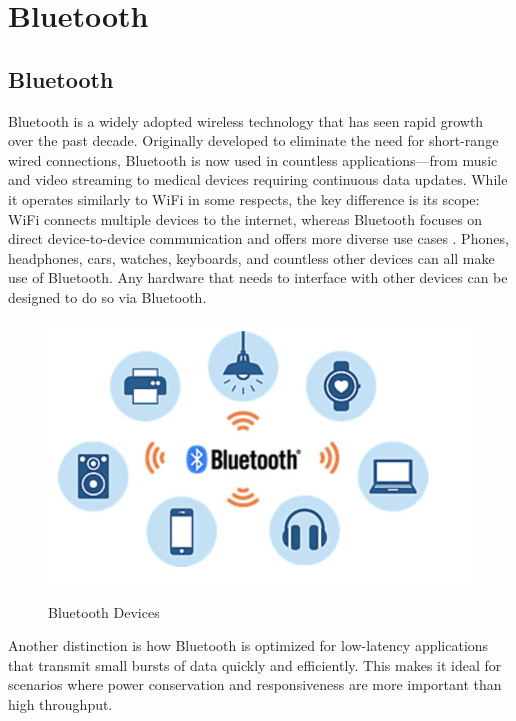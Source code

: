 \chapter{Bluetooth}\label{text}
\section{Bluetooth}

Bluetooth is a widely adopted wireless technology that has seen rapid growth over the past decade. Originally developed to eliminate the need for short-range wired connections, Bluetooth is now used in countless applications—from music and video streaming to medical devices requiring continuous data updates. 
While it operates similarly to WiFi in some respects, the key difference is its scope: WiFi connects multiple devices to the internet, whereas Bluetooth focuses on direct device-to-device communication and offers more diverse use cases \cite{intelBLEguide}. Phones, headphones, cars, watches, keyboards, and countless other devices can all make use of Bluetooth. Any hardware that needs to interface with other devices can be designed to do so via Bluetooth.

\begin{figure}[h]
    \caption{Bluetooth Devices}
    \includegraphics[scale=.7]{bluetoothdevices.png}
    \label{fig:bluetoothdevices}
    \end{figure}

Another distinction is how Bluetooth is optimized for low-latency applications that transmit small bursts of data quickly and efficiently.
This makes it ideal for scenarios where power conservation and responsiveness are more important than high throughput.

